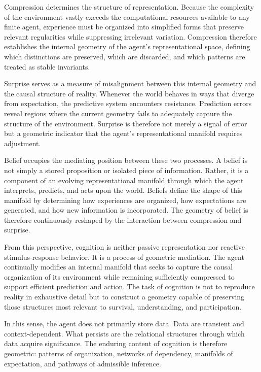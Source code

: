 \documentclass[12pt,letterpaper]{article}
\theoremstyle{remark}
\begin{document}
Compression determines the structure of representation. Because the complexity of the environment vastly exceeds the computational resources available to any finite agent, experience must be organized into simplified forms that preserve relevant regularities while suppressing irrelevant variation. Compression therefore establishes the internal geometry of the agent's representational space, defining which distinctions are preserved, which are discarded, and which patterns are treated as stable invariants.

Surprise serves as a measure of misalignment between this internal geometry and the causal structure of reality. Whenever the world behaves in ways that diverge from expectation, the predictive system encounters resistance. Prediction errors reveal regions where the current geometry fails to adequately capture the structure of the environment. Surprise is therefore not merely a signal of error but a geometric indicator that the agent's representational manifold requires adjustment.

Belief occupies the mediating position between these two processes. A belief is not simply a stored proposition or isolated piece of information. Rather, it is a component of an evolving representational manifold through which the agent interprets, predicts, and acts upon the world. Beliefs define the shape of this manifold by determining how experiences are organized, how expectations are generated, and how new information is incorporated. The geometry of belief is therefore continuously reshaped by the interaction between compression and surprise.

From this perspective, cognition is neither passive representation nor reactive stimulus-response behavior. It is a process of geometric mediation. The agent continually modifies an internal manifold that seeks to capture the causal organization of its environment while remaining sufficiently compressed to support efficient prediction and action. The task of cognition is not to reproduce reality in exhaustive detail but to construct a geometry capable of preserving those structures most relevant to survival, understanding, and participation.

In this sense, the agent does not primarily store data. Data are transient and context-dependent. What persists are the relational structures through which data acquire significance. The enduring content of cognition is therefore geometric: patterns of organization, networks of dependency, manifolds of expectation, and pathways of admissible inference.
\end{document}
